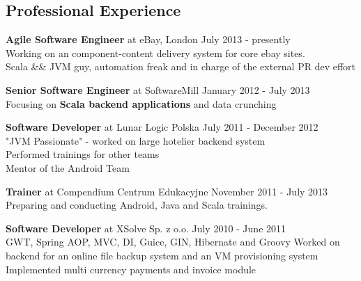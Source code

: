 \documentclass{res}
\begin{document}
 
 
 
\address{{\bf Konrad Malawski} \\
	Vienna -> Kraków -> London\\
	private mobile: +48 602 36 66 55 \\
	}
\address{
	email: konrad.malawski@project13.pl \\
  \textbf{linkedin: linkedin.com/in/konradmalawski} \\
	\textbf{github: github.com/ktoso} \\
	blog: \url{blog.project13.pl} \\
}


\begin{resume} 

\section{Professional Experience}
{\bf Agile Software Engineer} at eBay, London \hfill July 2013 - presently \\
    Working on an component-content delivery system for core ebay sites.\\
    Scala && JVM guy, automation freak and in charge of the external PR dev effort

{\bf Senior Software Engineer} at SoftwareMill \hfill January 2012 - July 2013 \\ 
    Focusing on \textbf{Scala backend applications} and data crunching

{\bf Software Developer} at Lunar Logic Polska \hfill July 2011 - December 2012 \\ 
    "JVM Passionate" - worked on large hotelier backend system \\ 
    Performed trainings for other teams \\
    Mentor of the Android Team

{\bf Trainer} at Compendium Centrum Edukacyjne \hfill November 2011 - July 2013 \\ 
	Preparing and conducting Android, Java and Scala trainings.
    
{\bf Software Developer} at XSolve Sp. z o.o. \hfill July 2010 - June 2011\\
	GWT, Spring {AOP, MVC, DI}, Guice, GIN, Hibernate and Groovy
	Worked on backend for an online file backup system and an VM provisioning system
	Implemented multi currency payments and invoice module
    

\end{resume}
\end{document}
